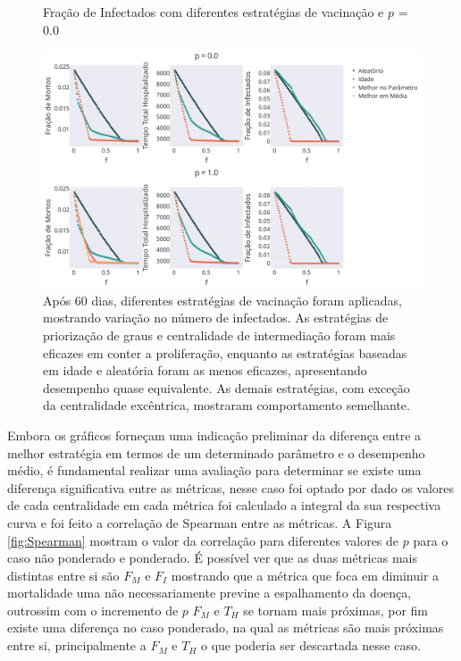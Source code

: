 \begin{figure}[H]
    \centering
    \captionsetup{font=normalsize,skip=0.8pt,singlelinecheck=on,labelsep=endash}
    \caption{Fração de Infectados com diferentes estratégias de vacinação e $p$ = 0.0}
    \includegraphics[scale= 0.3]{figuras/newplot.png}

    \captionsetup{font=small,justification=justified}
    
    \caption*{ Após 60 dias, diferentes estratégias de vacinação foram aplicadas, mostrando variação no número de infectados. As estratégias de priorização de graus e centralidade de intermediação foram mais eficazes em conter a proliferação, enquanto as estratégias baseadas em idade e aleatória foram as menos eficazes, apresentando desempenho quase equivalente. As demais estratégias, com exceção da centralidade excêntrica, mostraram comportamento semelhante.}
    \label{fig:resultados_metricas_ponderado}
\end{figure}

Embora os gráficos forneçam uma indicação preliminar da diferença entre a melhor estratégia em termos de um determinado parâmetro e o desempenho médio, é fundamental realizar uma avaliação para determinar se existe uma diferença significativa entre as métricas, nesse caso foi optado por dado os valores de cada centralidade em cada métrica foi calculado a integral da sua respectiva curva e foi feito a correlação de Spearman entre as métricas. A Figura \ref{fig:Spearman} mostram o valor da correlação para diferentes valores de $p$ para o caso não ponderado e ponderado. É possível ver que as duas métricas mais distintas entre si são $F_M$ e $F_I$ mostrando que a métrica que foca em diminuir a mortalidade uma não necessariamente previne a espalhamento da doença, outrossim com o incremento de $p$ $F_M$ e $T_H$ se tornam mais próximas, por fim existe uma diferença no caso ponderado, na qual as métricas são mais próximas entre si, principalmente a $F_M$ e $T_H$ o que poderia ser descartada nesse caso.

